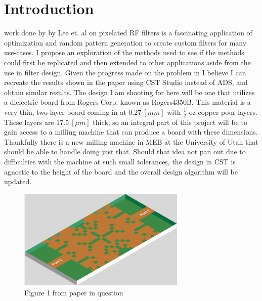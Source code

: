 \documentclass[journal]{IEEEtran}
\begin{document}
\section{Introduction}
 work done by by Lee et. al \cite{wei_pixrf} on pixelated RF filters is a fascinating application of optimization and random pattern generation to create custom filters for many use-cases. I propose an exploration of the methods used to see if the methods could first be replicated and then extended to other applications aside from the use in filter design. Given the progress made on the problem in \cite{wei_pixrf} I believe I can recreate the results shown in the paper using CST Studio instead of ADS, and obtain similar results. The design I am shooting for here will be one that utilizes a dielectric board from Rogers Corp. known as Rogers4350B. This material is a very thin, two-layer board coming in at $0.27\ [mm]$ with $\frac{1}{2}$-oz copper pour layers. These layers are $17.5\ [\mu m]$ thick, so an integral part of this project will be to gain access to a milling machine that can produce a board with these dimensions. Thankfully there is a new milling machine in MEB at the University of Utah that should be able to handle doing just that. Should that idea not pan out due to difficulties with the machine at such small tolerances, the design in CST is agnostic to the height of the board and the overall design algorithm will be updated.  
\begin{center}
\begin{figure}[h]
    \centering
    \includegraphics[width=8cm]{./images/pixelated_RF_fig1.png}
    \caption{Figure 1 from paper in question \cite{wei_pixrf}}
    \label{fig:pix}
  \end{figure}
\end{center}
\end{document}
